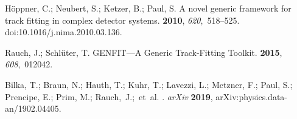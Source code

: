 \documentclass[instruments,article,accept,moreauthors,pdftex]{Definitions/mdpi}
\begin{document}
\begin{thebibliography}{999}
Höppner, C.; Neubert, S.; Ketzer, B.; Paul, S.
\newblock A novel generic framework for track fitting in complex detector
  systems.
 {\bf 2010},
  {\em 620},~518--525.
\newblock
  doi:10.1016/j.nima.2010.03.136.

Rauch, J.; Schlüter, T.
\newblock GENFIT---A Generic Track-Fitting Toolkit.
 {\bf 2015}, {\em
  608},~012042.

Bilka, T.; Braun, N.; Hauth, T.; Kuhr, T.; Lavezzi, L.; Metzner, F.; Paul, S.; Prencipe, E.; Prim, M.; Rauch,~J.;~et~al.
. \emph{arXiv} {\bf 2019}, arXiv:physics.data-an/1902.04405.

\end{thebibliography}



%
%





\end{document}
